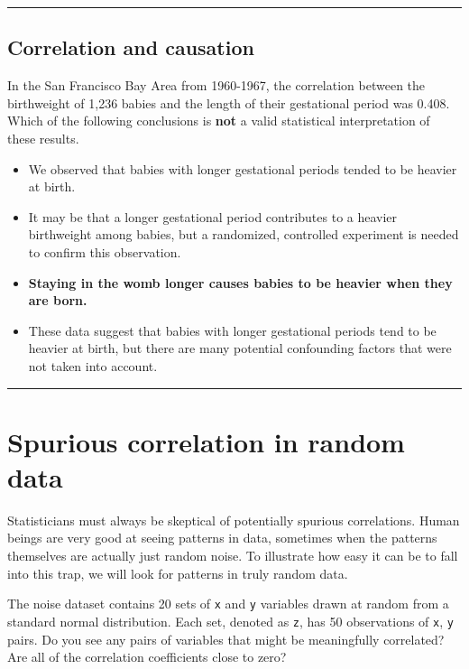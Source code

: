 \documentclass[
]{book}
\begin{document}
\begin{center}\rule{0.5\linewidth}{0.5pt}\end{center}

\hypertarget{correlation-and-causation}{%
\subsection*{Correlation and causation}\label{correlation-and-causation}}

In the San Francisco Bay Area from 1960-1967, the correlation between the birthweight of 1,236 babies and the length of their gestational period was 0.408. Which of the following conclusions is \textbf{not} a valid statistical interpretation of these results.

\begin{itemize}
\item
  We observed that babies with longer gestational periods tended to be heavier at birth.
\item
  It may be that a longer gestational period contributes to a heavier birthweight among babies, but a randomized, controlled experiment is needed to confirm this observation.
\item
  \textbf{Staying in the womb longer causes babies to be heavier when they are born.}
\item
  These data suggest that babies with longer gestational periods tend to be heavier at birth, but there are many potential confounding factors that were not taken into account.
\end{itemize}

\begin{center}\rule{0.5\linewidth}{0.5pt}\end{center}

\hypertarget{spurious-correlation-in-random-data}{%
\section{Spurious correlation in random data}\label{spurious-correlation-in-random-data}}

Statisticians must always be skeptical of potentially spurious correlations. Human beings are very good at seeing patterns in data, sometimes when the patterns themselves are actually just random noise. To illustrate how easy it can be to fall into this trap, we will look for patterns in truly random data.

The noise dataset contains 20 sets of \texttt{x} and \texttt{y} variables drawn at random from a standard normal distribution. Each set, denoted as \texttt{z}, has 50 observations of \texttt{x}, \texttt{y} pairs. Do you see any pairs of variables that might be meaningfully correlated? Are all of the correlation coefficients close to zero?
\end{document}
